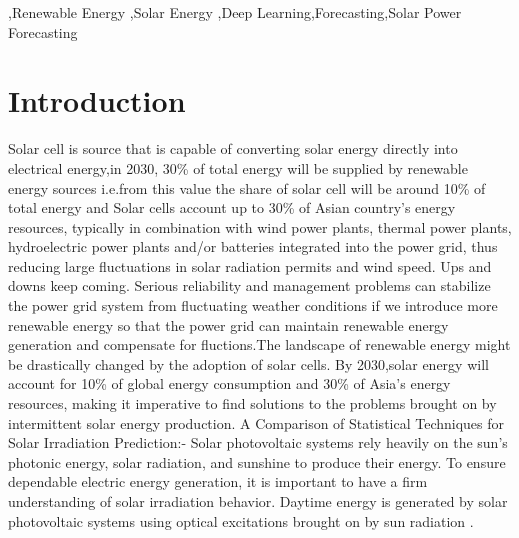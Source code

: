 \documentclass[a4paper,fleqn]{cas-sc}
\begin{document}

\begin{highlights}
\item 
\item 
\item 
\end{highlights}

\begin{keywords}
 \sep Renewable Energy \sep Solar Energy \sep Deep Learning\sep Forecasting\sep Solar Power Forecasting
\end{keywords}

\maketitle

\section{Introduction}
Solar cell is source that is capable of converting solar energy directly into electrical energy,in 2030, 30\% of total energy will be supplied by renewable energy sources i.e.from this value the share of solar cell will be around 10\% of total energy and Solar cells account up to 30\% of Asian country’s energy resources, typically in combination with wind power plants, thermal power plants, hydroelectric power plants and/or batteries integrated into the power grid, thus reducing large fluctuations in solar radiation permits and wind speed. Ups and downs keep coming. Serious reliability and management problems can stabilize the power grid system from fluctuating weather conditions if we introduce more renewable energy so that the power grid can maintain renewable energy generation and compensate for fluctions.The landscape of renewable energy might be drastically changed by the adoption of solar cells. By 2030,solar energy will account for 10\% of global energy consumption and 30\% of Asia’s energy resources, making it imperative to find solutions to the problems brought on by intermittent solar energy production\cite{rai2022robust}.
A Comparison of Statistical Techniques for Solar Irradiation Prediction:- Solar photovoltaic systems rely heavily on the sun’s photonic energy, solar radiation, and sunshine to produce their energy. To ensure dependable electric energy generation, it is important to have a firm understanding of solar irradiation behavior. Daytime energy is generated by solar photovoltaic systems using optical excitations brought on by sun radiation \cite{brahma2020solar}.
\end{document}
